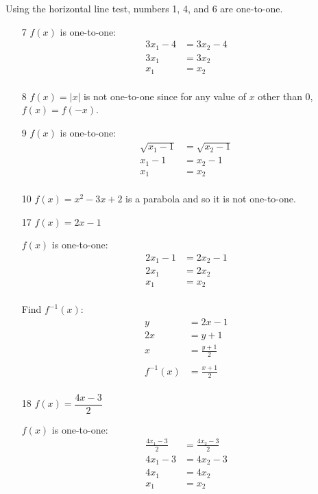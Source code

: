 \documentclass[fleqn,addpoints]{exam}
\begin{document}
Using the horizontal line test, numbers 1, 4, and 6 are one-to-one.

\begin{itemize}
\item[7]
$f(x)$ is one-to-one:
\begin{align*}
  3x_1 - 4 &= 3x_2 - 4 \\
  3x_1 &= 3x_2 \\
  x_1 &= x_2 \\
\end{align*}

\item[8]
$f(x) = |x|$ is not one-to-one since for any value of $x$ other than 0, $f(x) = f(-x)$.

\item[9]
$f(x)$ is one-to-one:
\begin{align*}
  \sqrt{x_1 - 1} &= \sqrt{x_2 - 1} \\
  x_1 - 1 &= x_2 - 1 \\
  x_1 &= x_ 2 \\
\end{align*}

\item[10]
$f(x) = x^2 - 3x + 2$ is a parabola and so it is not one-to-one.

\item[17]
$f(x) = 2x-1$

$f(x)$ is one-to-one:
\begin{align*}
  2x_1 - 1 &= 2x_2 - 1 \\
  2x_1 &= 2x_2 \\
  x_1 &= x_2 \\
\end{align*}

Find $f^{-1}(x)$:
\begin{align*}
  y &= 2x-1 \\
  2x &= y + 1 \\
  x &= \frac{y+1}{2} \\
  \\
  f^{-1}(x) &= \frac{x+1}{2} \\
\end{align*}

\item[18]
$f(x) = \dfrac{4x-3}{2}$

$f(x)$ is one-to-one:
\begin{align*}
  \frac{4x_1-3}{2} &= \frac{4x_2-3}{2} \\
  4x_1-3 &= 4x_2 - 3 \\
  4x_1 &= 4x_2 \\
  x_1 &= x_2 \\
\end{align*}


\end{itemize}
\end{document}
